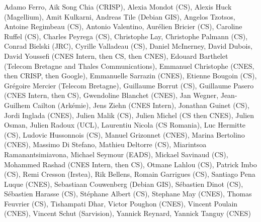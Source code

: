Adamo Ferro,
Aik Song Chia (CRISP),
Alexia Mondot (CS),
Alexis Huck (Magellium),
Amit Kulkarni,
Andreas Tile (Debian GIS),
Angelos Tzotsos,
Antoine Regimbeau (CS),
Antonio Valentino,
Aur\'elien Bricier (CS),
Caroline Ruffel (CS),
Charles Peyrega (CS),
Christophe Lay,
Christophe Palmann (CS),
Conrad Bielski (JRC),
Cyrille Valladeau (CS),
Daniel McInerney,
David Dubois,
David Youssefi  (CNES Intern, then CS, then CNES),
Edouard Barthelet (Telecom Bretagne and Thales Communications),
Emmanuel Christophe (CNES, then CRISP, then Google),
Emmanuelle Sarrazin (CNES),
Etienne Bougoin (CS),
Gr\'egoire Mercier (Telecom Bretagne),
Guillaume Borrut (CS),
Guillaume Pasero (CNES Intern, then CS),
Gwendoline Blanchet (CNES),
Jan Wegner,
Jean-Guilhem Cailton (Ark\'emie),
Jens Ziehn (CNES Intern),
Jonathan Guinet (CS),
Jordi Inglada (CNES),
Julien Malik (CS),
Julien Michel (CS then CNES),
Julien Osman,
Julien Radoux (UCL),
Laurentiu Nicola (CS Romania),
Luc Hermitte (CS),
Ludovic Hussonnois (CS),
Manuel Grizonnet (CNES),
Marina Bertolino (CNES),
Massimo Di Stefano,
Mathieu Deltorre (CS),
Miarintsoa Ramanantsimiavona,
Michael Seymour (EADS),
Mickael Savinaud (CS),
Mohammed Rashad (CNES Intern, then CS),
Otmane Lahlou (CS),
Patrick Imbo (CS),
Remi Cresson (Irstea),
Rik Bellens,
Romain Garrigues (CS),
Santiago Pena Luque (CNES),
Sebastiaan Couwenberg (Debian GIS),
S\'ebastien Dinot (CS),
S\'ebastien Harasse (CS),
St\'ephane Albert (CS),
Stephane May (CNES),
Thomas Feuvrier (CS),
Tishampati Dhar,
Victor Poughon (CNES),
Vincent Poulain (CNES),
Vincent Schut (Sarvision),
Yannick Reynard,
Yannick Tanguy (CNES)
